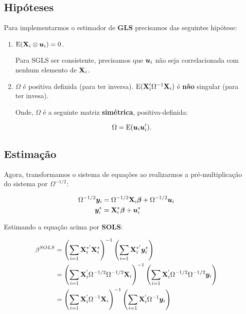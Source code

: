 \documentclass[11pt, oneside, a4paper, article]{article}
\numberwithin{equation}{section}
\begin{document}
\noindent
\citet[Sec.7.4 -- Consistency and Asymptotic Normality of Generalized Least Squares, p.153]{wool-2010} 

\subsection*{Hipóteses}

Para implementarmos o estimador de \textbf{GLS} precisamos das seguintes hipótese:

\begin{enumerate}
\item %

$\text{E}(\mathbf{X}_{i} \otimes \boldsymbol{u}_{i}) = 0$.

Para SGLS ser consistente, precisamos que $\boldsymbol{u}_{i}$ não seja correlacionada com nenhum elemento de $\mathbf{X}_{i}$.

\item %

$\Omega$ é positiva definida (para ter inversa).
$\text{E}(\mathbf{X}_{i}^{\prime} \Omega^{-1} \mathbf{X}_{i})$ é \textbf{não} singular (para ter invesa).

Onde, $\Omega$ é a seguinte matriz \textbf{simétrica}, positiva-definida:

\vspace{-1.5 em}
\begin{align*}
\Omega = \text{E}(\boldsymbol{u}_{i} \boldsymbol{u}_{i}^{\prime}).
\end{align*}
\end{enumerate}

\subsection*{Estimação}

Agora, transformamos o sistema de equações ao realizarmos a pré-multiplicação do sistema por $\Omega^{-1/2}$:

\vspace{-1.5 em}
\begin{align*}
\Omega^{-1/2} \boldsymbol{y}_{i} 
&=
\Omega^{-1/2} \mathbf{X}_{i} \boldsymbol{\beta}
+
\Omega^{-1/2} \boldsymbol{u}_{i}
\\
\boldsymbol{y}_{i}^{*}
&=
\mathbf{X}_{i}^{*} \boldsymbol{\beta}
+
\boldsymbol{u}^{*}_{i}
\end{align*}

Estimando a equação acima por \textbf{SOLS}:

\vspace{-1.5 em}
\begin{align*}
\beta^{SOLS}
&=
\left( \sum_{i=1} \mathbf{X}_{i}^{*'} \mathbf{X}_{i}^{*} \right)^{-1}
\left( \sum_{i=1} \mathbf{X}_{i}^{*'} \boldsymbol{y}_{i}^{*} \right)
\\
&=
\left( \sum_{i=1} \mathbf{X}_{i}^{'} \Omega^{-1/2} \Omega^{-1/2} \mathbf{X}_{i} \right)^{-1}
\left( \sum_{i=1} \mathbf{X}_{i}^{'} \Omega^{-1/2} \Omega^{-1/2} \boldsymbol{y}_{i} \right)
\\
&=
\left( \sum_{i=1} \mathbf{X}_{i}^{'} \Omega^{-1} \mathbf{X}_{i} \right)^{-1}
\left( \sum_{i=1} \mathbf{X}_{i}^{'} \Omega^{-1} \boldsymbol{y}_{i} \right)
\end{align*}
\end{document}
